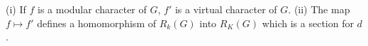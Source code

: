 (i) If $f$ is a modular character of $G$, $f'$ is a virtual character of $G$.
(ii) The map $f \mapsto f'$ defines a homomorphism of $R_k(G)$ into $R_K(G)$ which is a section for $d$.
